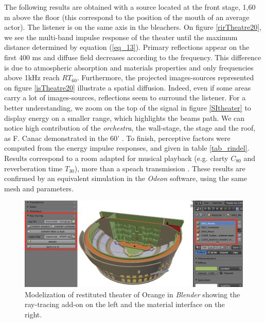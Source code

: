 \documentclass[AMA,STIX1COL]{WileyNJD-v2}
\begin{document}
The following results are obtained with a source located at the front stage, 1,60 m above the floor (this correspond to the position of the mouth of an average actor). The listener is on the same axis in the bleachers. On figure \ref{rirTheatre20}, we see the multi-band impulse response of the theater until the maximum distance determined by equation (\ref{eq_13}). Primary reflections appear on the first 400 ms and diffuse field decreases according to the frequency. This difference is due to atmospheric absorption and materials properties and only frequencies above 1kHz reach $RT_{60}$. Furthermore, the projected images-sources represented on figure \ref{isTheatre20} illustrate a spatial diffusion. Indeed, even if some areas carry a lot of images-sources, reflections seem to surround the listener. For a better understanding, we zoom on the top of the signal in figure \ref{SItheater} to display energy on a smaller range, which highlights the beams path. We can notice high contribution of the \textit{orchestra}, the wall-stage, the stage and the roof, as F. Canac demonstrated in the 60' \cite{canac}. To finish, perceptive factors were computed from the energy impulse responses, and given in table \ref{tab_rindel}. Results correspond to a room adapted for musical playback (e.g. clarty $C_{80}$ and reverberation time $T_{30}$), more than a speach transmission \cite{acoustique}. These results are confirmed by an equivalent simulation in the \textit{Odeon} software, using the same mesh and parameters.


\begin{figure}[t]
\centering
		\includegraphics[width=0.9\linewidth]{soft}
		\caption{Modelization of restituted theater of Orange \cite{theseRobin} in \textit{Blender} showing the ray-tracing add-on on the left and the material interface on the right.}
		\label{soft}
\end{figure}
\end{document}
